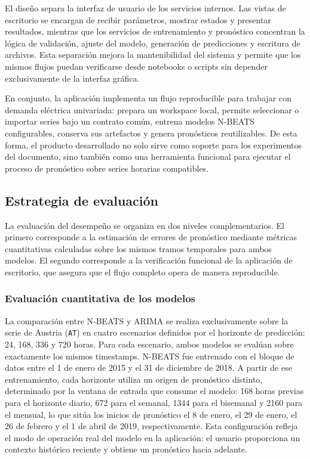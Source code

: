 El diseño separa la interfaz de usuario de los servicios internos. Las vistas de escritorio se encargan de recibir parámetros, mostrar estados y presentar resultados, mientras que los servicios de entrenamiento y pronóstico concentran la lógica de validación, ajuste del modelo, generación de predicciones y escritura de archivos. Esta separación mejora la mantenibilidad del sistema y permite que los mismos flujos puedan verificarse desde notebooks o scripts sin depender exclusivamente de la interfaz gráfica.

En conjunto, la aplicación implementa un flujo reproducible para trabajar con demanda eléctrica univariada: prepara un workspace local, permite seleccionar o importar series bajo un contrato común, entrena modelos N-BEATS configurables, conserva sus artefactos y genera pronósticos reutilizables. De esta forma, el producto desarrollado no solo sirve como soporte para los experimentos del documento, sino también como una herramienta funcional para ejecutar el proceso de pronóstico sobre series horarias compatibles.

\subsection{Estrategia de evaluación}

La evaluación del desempeño se organiza en dos niveles complementarios. El primero corresponde a la estimación de errores de pronóstico mediante métricas cuantitativas calculadas sobre los mismos tramos temporales para ambos modelos. El segundo corresponde a la verificación funcional de la aplicación de escritorio, que asegura que el flujo completo opera de manera reproducible.

\subsubsection{Evaluación cuantitativa de los modelos}

La comparación entre N-BEATS y ARIMA se realiza exclusivamente sobre la serie de Austria (\texttt{AT}) en cuatro escenarios definidos por el horizonte de predicción: 24, 168, 336 y 720 horas. Para cada escenario, ambos modelos se evalúan sobre exactamente los mismos timestamps. N-BEATS fue entrenado con el bloque de datos entre el 1 de enero de 2015 y el 31 de diciembre de 2018. A partir de ese entrenamiento, cada horizonte utiliza un origen de pronóstico distinto, determinado por la ventana de entrada que consume el modelo: 168 horas previas para el horizonte diario, 672 para el semanal, 1344 para el bisemanal y 2160 para el mensual, lo que sitúa los inicios de pronóstico el 8 de enero, el 29 de enero, el 26 de febrero y el 1 de abril de 2019, respectivamente. Esta configuración refleja el modo de operación real del modelo en la aplicación: el usuario proporciona un contexto histórico reciente y obtiene un pronóstico hacia adelante.

